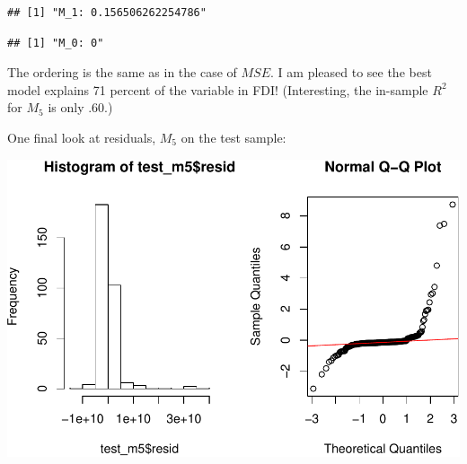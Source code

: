 \documentclass[11pt,]{article}
\newenvironment{Shaded}{\begin{snugshade}}{\end{snugshade}}
\newcommand{\DataTypeTok}[1]{\textcolor[rgb]{0.13,0.29,0.53}{#1}}
\newcommand{\DecValTok}[1]{\textcolor[rgb]{0.00,0.00,0.81}{#1}}
\newcommand{\KeywordTok}[1]{\textcolor[rgb]{0.13,0.29,0.53}{\textbf{#1}}}
\newcommand{\NormalTok}[1]{#1}
\newcommand{\OperatorTok}[1]{\textcolor[rgb]{0.81,0.36,0.00}{\textbf{#1}}}
\newcommand{\StringTok}[1]{\textcolor[rgb]{0.31,0.60,0.02}{#1}}
\begin{document}
\begin{verbatim}
## [1] "M_1: 0.156506262254786"
\end{verbatim}

\begin{Shaded}
\end{Shaded}

\begin{verbatim}
## [1] "M_0: 0"
\end{verbatim}

The ordering is the same as in the case of \(MSE\). I am pleased to see
the best model explains 71 percent of the variable in FDI! (Interesting,
the in-sample \(R^2\) for \(M_5\) is only .60.)

One final look at residuals, \(M_5\) on the test sample:

\begin{Shaded}
\end{Shaded}

\includegraphics{report_files/figure-latex/unnamed-chunk-28-1.pdf}
\end{document}
